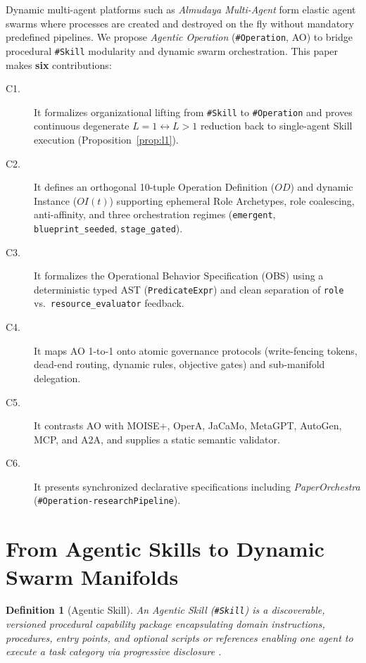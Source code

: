 \documentclass[11pt,a4paper]{article}
\newtheorem{definition}{Definition}
\begin{document}
Dynamic multi-agent platforms such as \emph{Almudaya Multi-Agent} form elastic agent swarms where processes are created and destroyed on the fly without mandatory predefined pipelines. We propose \emph{Agentic Operation} (\texttt{\#Operation}, AO) to bridge procedural \texttt{\#Skill} modularity and dynamic swarm orchestration. This paper makes \textbf{six} contributions:
\begin{description}
  \item[C1.] It formalizes organizational lifting from \texttt{\#Skill} to \texttt{\#Operation} and proves continuous degenerate $L=1 \leftrightarrow L>1$ reduction back to single-agent Skill execution (Proposition~\ref{prop:l1}).
  \item[C2.] It defines an orthogonal 10-tuple Operation Definition ($OD$) and dynamic Instance ($OI(t)$) supporting ephemeral Role Archetypes, role coalescing, anti-affinity, and three orchestration regimes (\texttt{emergent}, \texttt{blueprint\_seeded}, \texttt{stage\_gated}).
  \item[C3.] It formalizes the Operational Behavior Specification (OBS) using a deterministic typed AST (\texttt{PredicateExpr}) and clean separation of \texttt{role} vs.\ \texttt{resource\_evaluator} feedback.
  \item[C4.] It maps AO 1-to-1 onto atomic governance protocols (write-fencing tokens, dead-end routing, dynamic rules, objective gates) and sub-manifold delegation.
  \item[C5.] It contrasts AO with MOISE+, OperA, JaCaMo, MetaGPT, AutoGen, MCP, and A2A, and supplies a static semantic validator.
  \item[C6.] It presents synchronized declarative specifications including \emph{PaperOrchestra} (\texttt{\#Operation-researchPipeline}).
\end{description}

\section{From Agentic Skills to Dynamic Swarm Manifolds}
\begin{definition}[Agentic Skill]
An \emph{Agentic Skill} (\texttt{\#Skill}) is a discoverable, versioned procedural capability package encapsulating domain instructions, procedures, entry points, and optional scripts or references enabling one agent to execute a task category via progressive disclosure \cite{anthropic2025skills}.
\end{definition}
\end{document}
